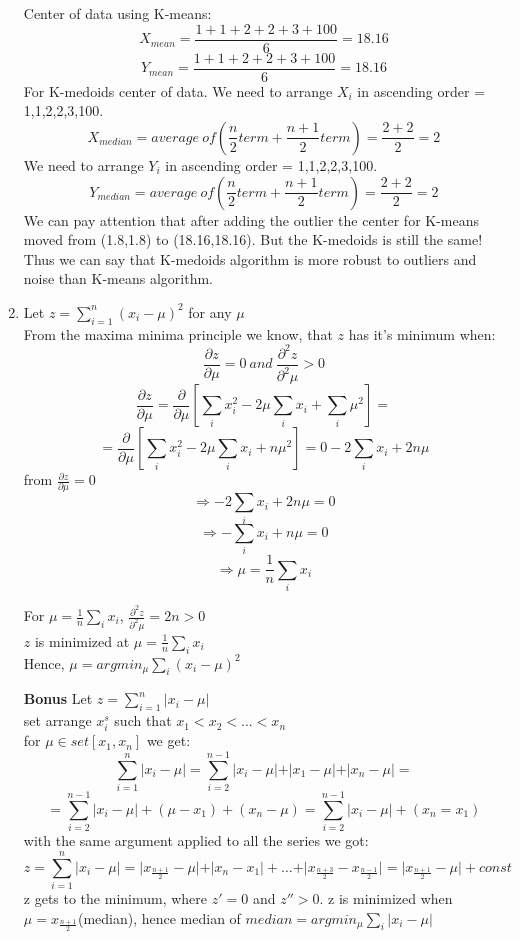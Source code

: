 \documentclass[12pt,a4paper]{article}
\begin{document}
\begin{enumerate}[label=(\alph*)]
Center of data using K-means:\\
$$
\displaystyle X_{mean} = \frac{1+1+2+2+3+100}{6} = 18.16 
$$
$$
\displaystyle Y_{mean} = \frac{1+1+2+2+3+100}{6} = 18.16  
$$
For K-medoids center of data. We need to arrange $X_i$ in ascending order = 1,1,2,2,3,100.\\
$$
\displaystyle X_{median} = average~ of (\frac{n}{2}term+\frac{n+1}{2}term) = \frac{2+2}{2}=2
$$ 
We need to arrange $Y_i$ in ascending order = 1,1,2,2,3,100.\\
$$
\displaystyle Y_{median} = average~ of (\frac{n}{2}term+\frac{n+1}{2}term) = \frac{2+2}{2}=2
$$ 
We can pay attention that after adding the outlier the center for K-means moved from (1.8,1.8) to (18.16,18.16). But the K-medoids is still the same! Thus we can say that K-medoids algorithm is more  robust to outliers and noise than K-means algorithm.

\item Let $z = \sum_{i=1}^{n}\left(x_i - \mu \right)^2  $ for any $\mu$\\
From the maxima minima principle we know, that $z$ has it's minimum when:
$$
\displaystyle \frac{\partial z}{\partial \mu} = 0 ~ and ~ \frac{\partial^2 z}{\partial^2 \mu} > 0
$$$$
\displaystyle \frac{\partial z}{\partial \mu} = \frac{\partial}{\partial \mu}\left[ \sum_i x_i^2 - 2\mu \sum_i x_i + \sum_i \mu^2 \right] = 
$$$$
\displaystyle =  \frac{\partial}{\partial \mu}\left[ \sum_i x_i^2 - 2\mu \sum_i x_i + n \mu^2 \right] = 0 - 2\sum_i x_i +2n\mu
$$
from $\frac{\partial z}{\partial \mu} = 0$
$$
\displaystyle \Longrightarrow  -2\sum_i x_i +2n\mu = 0
$$
$$
\displaystyle \Longrightarrow  -\sum_i x_i +n\mu = 0
$$
$$
\displaystyle \Longrightarrow  \mu =\frac{1}{n} \sum_i x_i 
$$

For $\mu =\frac{1}{n} \sum_i x_i $, $\frac{\partial^2 z}{\partial^2 \mu} = 2n > 0$\\[5pt]
$z$ is minimized at $\mu =\frac{1}{n} \sum_i x_i $\\[5pt]
Hence, $\mu =argmin_\mu\sum_i \left(x_i -\mu \right)^2$



\item[\textbf{Bonus}] Let $z = \sum_{i=1}^{n}\vert x_i - \mu \vert$\\[5pt]
set arrange $x_i^s$ such that $x_1<x_2<\dots<x_n$\\[5pt]
for $\mu \in set[x_1,x_n]$ we get:
$$
\displaystyle \sum_{i=1}^{n}\vert x_i - \mu \vert = \sum_{i=2}^{n-1}\vert x_i - \mu \vert + \vert x_1 - \mu \vert + \vert x_n - \mu \vert = 
$$$$
\displaystyle = \sum_{i=2}^{n-1}\vert x_i - \mu \vert + (\mu - x_1) + (x_n - \mu) = \sum_{i=2}^{n-1}\vert x_i - \mu \vert + (x_n = x_1)
$$
with the same argument applied to all the series we got:
$$
\displaystyle z = \sum_{i=1}^{n}\vert x_i - \mu \vert = \vert x_{\frac{n+1}{2}} - \mu \vert + \vert x_n - x_1 \vert + \dots + \vert x_{\frac{n+3}{2}} - x_{\frac{n-1}{2}} \vert= \vert  x_{\frac{n+1}{2}} - \mu \vert + const
$$
z gets to the minimum, where $z'=0$ and $z''>0$.  z is minimized when $\mu = x_{\frac{n+1}{2}}$(median), hence median of $median = argmin_{\mu}\sum_i \vert x_i - \mu \vert$
\end{enumerate}
\end{document}
